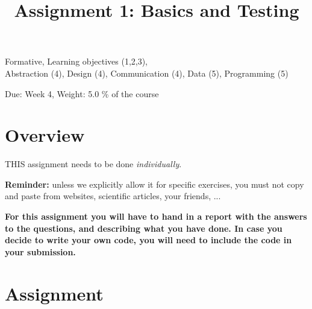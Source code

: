 \documentclass{pracs}
\newcommand{\duedate}{Week 4}
\begin{document}
\title{Assignment 1: Basics and Testing}
\maketitle
\thispagestyle{fancy}


	Formative, 	Learning objectives (1,2,3),\\
 	Abstraction (4), 	Design (4), 	Communication (4), 	Data (5),	Programming (5)




\noindent 

 \begin{center}
    Due: \duedate, Weight: 5.0 \% of the course
  \end{center}




\section{Overview}
THIS assignment needs to be done \emph{individually}. 

\textbf{Reminder:} unless we explicitly allow it for specific exercises, you must not copy and paste from websites, scientific articles, your friends, ...

\textbf{For this assignment you will have to hand in a report with the answers to the questions, and describing what you have done. In case you decide to write your own code,  you will need to include the code in your submission.}



\section{Assignment}
\end{document}
